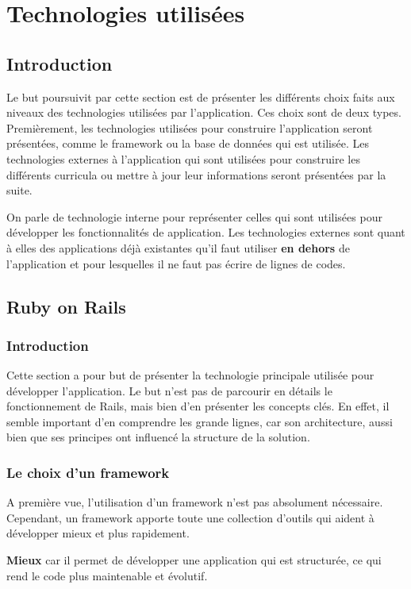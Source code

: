 \section{Technologies utilisées}
\subsection{Introduction}
Le but poursuivit par cette section est de présenter les différents choix faits aux niveaux des technologies utilisées par l'application. Ces choix sont de deux types. Premièrement, les technologies utilisées pour construire l'application seront présentées, comme le framework ou la base de données qui est utilisée. Les technologies externes à l'application qui sont utilisées pour construire les différents curricula ou mettre à jour leur informations seront présentées par la suite.

On parle de technologie interne pour représenter celles qui sont utilisées pour développer les fonctionnalités de application. Les technologies externes sont quant à elles des applications déjà existantes qu'il faut utiliser \textbf{en dehors} de l'application et pour lesquelles il ne faut pas écrire de lignes de codes.
\subsection{Ruby on Rails}
\subsubsection{Introduction}

Cette section a pour but de présenter la technologie principale utilisée pour développer l'application. Le but n'est pas de parcourir en détails le fonctionnement de Rails, mais bien d'en présenter les concepts clés. En effet, il semble important d'en comprendre les grande lignes, car son architecture, aussi bien que ses principes ont influencé la structure de la solution.
\subsubsection{Le choix d'un framework}
A première vue, l'utilisation d'un framework n'est pas absolument nécessaire. Cependant, un framework apporte toute une collection d'outils qui aident à développer mieux et plus rapidement.

\textbf{Mieux} car il permet de développer une application qui est structurée, ce qui rend le code plus maintenable et évolutif.

